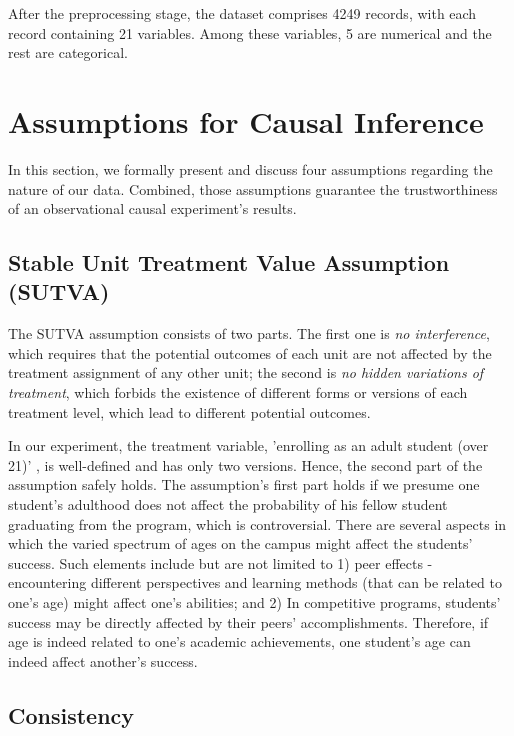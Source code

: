 \documentclass{article}
\newcommand{\todo}[1]{{\color{orange}{TODO: #1}}}
\newcommand{\gur}[1]{{\color{teal}{Gur: #1}}}
\begin{document}
\todo{scaling and encoding - I think that it can come later on in the analysis part, but don't forget!}

After the preprocessing stage, the dataset comprises 4249 records, with each record containing 21 variables. Among these variables, 5 are numerical and the rest are categorical.


\section{Assumptions for Causal Inference}

In this section, we formally present and discuss four assumptions regarding the nature of our data. Combined, those assumptions guarantee the trustworthiness of an observational causal experiment's results.

\subsection{Stable Unit Treatment Value Assumption (SUTVA)}

The SUTVA assumption consists of two parts. The first one is \emph{no interference}, which requires that the potential outcomes of each unit are not affected by the treatment assignment of any other unit; the second is \emph{no hidden variations of treatment}, which forbids the existence of different forms or versions of each treatment level, which lead to different potential outcomes.

In our experiment, the treatment variable, 'enrolling as an adult student (over 21)' \gur{is it?}, is well-defined and has only two versions. Hence, the second part of the assumption safely holds. The assumption's first part holds if we presume one student's adulthood does not affect the probability of his fellow student graduating from the program, which is controversial. There are several aspects in which the varied spectrum of ages on the campus might affect the students' success. Such elements include but are not limited to 1) peer effects - encountering different perspectives and learning methods (that can be related to one's age) might affect one's abilities; and 2) In competitive programs, students' success may be directly affected by their peers' accomplishments. Therefore, if age is indeed related to one's academic achievements, one student's age can indeed affect another's success.

\subsection{Consistency}
\end{document}
